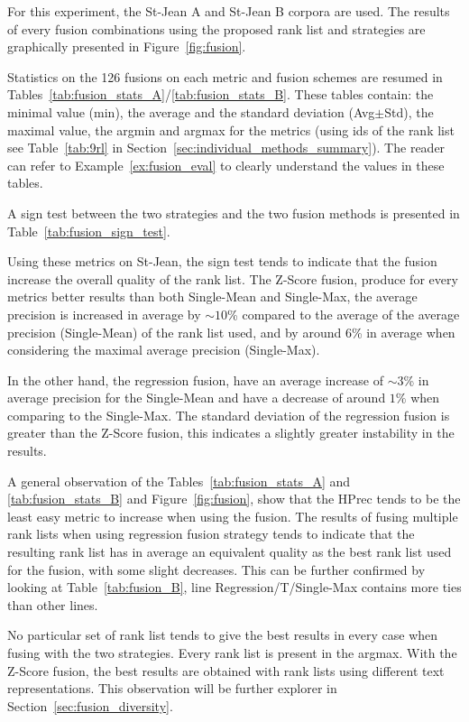 For this experiment, the St-Jean A and St-Jean B corpora are used.
The results of every fusion combinations using the proposed rank list and strategies are graphically presented in Figure~\ref{fig:fusion}.

Statistics on the 126 fusions on each metric and fusion schemes are resumed in Tables~\ref{tab:fusion_stats_A}/\ref{tab:fusion_stats_B}.
These tables contain: the minimal value (min), the average and the standard deviation (Avg$\pm$Std), the maximal value, the argmin and argmax for the metrics (using ids of the rank list see Table~\ref{tab:9rl} in Section~\ref{sec:individual_methods_summary}).
The reader can refer to Example~\ref{ex:fusion_eval} to clearly understand the values in these tables.

A sign test between the two strategies and the two fusion methods is presented in Table~\ref{tab:fusion_sign_test}.

Using these metrics on St-Jean, the sign test tends to indicate that the fusion increase the overall quality of the rank list.
The Z-Score fusion, produce for every metrics better results than both Single-Mean and Single-Max, the average precision is increased in average by $\sim 10$\% compared to the average of the average precision (Single-Mean) of the rank list used, and by around 6\% in average when considering the maximal average precision (Single-Max).

In the other hand, the regression fusion, have an average increase of $\sim 3$\% in average precision for the Single-Mean and have a decrease of around $1\%$ when comparing to the Single-Max.
The standard deviation of the regression fusion is greater than the Z-Score fusion, this indicates a slightly greater instability in the results.

A general observation of the Tables~\ref{tab:fusion_stats_A} and \ref{tab:fusion_stats_B} and Figure~\ref{fig:fusion}, show that the HPrec tends to be the least easy metric to increase when using the fusion.
The results of fusing multiple rank lists when using regression fusion strategy tends to indicate that the resulting rank list has in average an equivalent quality as the best rank list used for the fusion, with some slight decreases.
This can be further confirmed by looking at Table~\ref{tab:fusion_B}, line Regression/T/Single-Max contains more ties than other lines.

No particular set of rank list tends to give the best results in every case when fusing with the two strategies.
Every rank list is present in the argmax.
With the Z-Score fusion, the best results are obtained with rank lists using different text representations.
This observation will be further explorer in Section~\ref{sec:fusion_diversity}.

